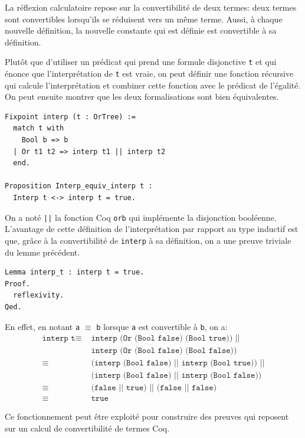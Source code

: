\documentclass[11pt]{article}
\begin{document}
La réflexion calculatoire repose sur la convertibilité de deux termes: deux termes sont convertibles lorsqu'ils se réduisent vers un même terme. Aussi, à chaque nouvelle définition, la nouvelle constante qui est définie est convertible à sa définition. \medbreak

Plutôt que d'utiliser un prédicat qui prend une formule disjonctive \texttt{t} et qui énonce que l'interprétation de \texttt{t} est vraie, on peut définir une fonction récursive qui calcule l'interprétation et combiner cette fonction avec le prédicat de l'égalité. On peut ensuite montrer que les deux formalisations sont bien équivalentes.  

\begin{lstlisting}[frame=single]
Fixpoint interp (t : OrTree) :=
  match t with
    Bool b => b
  | Or t1 t2 => interp t1 || interp t2
  end.

Proposition Interp_equiv_interp t :
  Interp t <-> interp t = true.
\end{lstlisting}

On a noté \texttt{||} la fonction Coq \texttt{orb} qui implémente la disjonction booléenne.
L'avantage de cette définition de l'interprétation par rapport au type inductif est que, grâce à la convertibilité de \texttt{interp} à sa définition, on a une preuve triviale du lemme précédent.

\begin{lstlisting}[frame=single]
Lemma interp_t : interp t = true.
Proof.
  reflexivity.
Qed.
\end{lstlisting}

En effet, en notant \texttt{a} $\equiv$ \texttt{b} lorsque \texttt{a} est convertible à \texttt{b}, on a:
\begin{align*}
  \texttt{interp t} \equiv \,\, &\texttt{interp (Or (Bool false) (Bool true)) ||}  \\
  \,\, &\texttt{interp (Or (Bool false) (Bool false))} \\
  \equiv \,\, &\texttt{(interp (Bool false) || interp (Bool true)) ||} \\
  \,\,&\texttt{(interp (Bool false) || interp (Bool false))} \\
  \equiv \,\, &\texttt{(false || true) || (false || false)} \\
  \equiv\,\, &\texttt{true}
\end{align*}  

Ce fonctionnement peut être exploité pour construire des preuves qui reposent sur un calcul de convertibilité de termes Coq.
\end{document}
